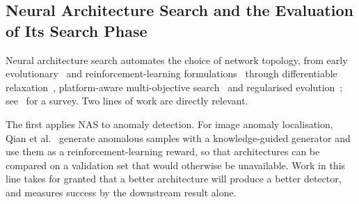 \subsection{Neural Architecture Search and the Evaluation of Its Search Phase}
\label{subsec:related_nas}

Neural architecture search automates the choice of network topology, from
early evolutionary~\cite{xie2017genetic} and reinforcement-learning
formulations~\cite{zoph2018learning,liu2018progressive} through differentiable
relaxation~\cite{liu2019darts}, platform-aware multi-objective
search~\cite{tan2019mnasnet} and regularised
evolution~\cite{real2019regularized}; see~\cite{ren2021comprehensive} for a survey.
Two lines of work are directly relevant.

The first applies NAS to anomaly detection. For image anomaly localisation,
Qian et al.~\cite{qian2024knowledgeguided} generate anomalous samples with a
knowledge-guided generator and use them as a reinforcement-learning reward, so
that architectures can be compared on a validation set that would otherwise be
unavailable. Work in this line takes for granted that a better architecture will
produce a better detector, and measures success by the downstream result alone.

